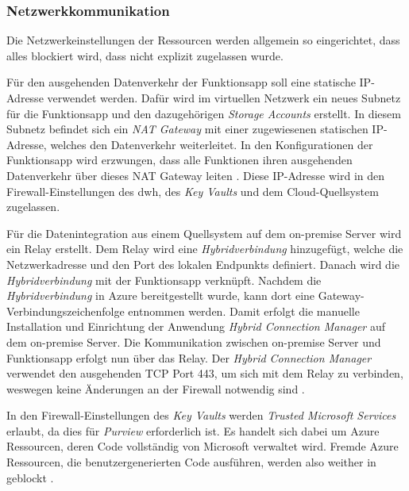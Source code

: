 \subsubsection{Netzwerkkommunikation} \label{subsec:infra:konfig:netzwerk}
Die Netzwerkeinstellungen der Ressourcen werden allgemein so eingerichtet, dass alles blockiert wird, dass nicht explizit zugelassen wurde. 

Für den ausgehenden Datenverkehr der Funktionsapp soll eine statische IP-Adresse verwendet werden. Dafür wird im virtuellen Netzwerk ein neues Subnetz für die Funktionsapp und den dazugehörigen \textit{Storage Accounts} erstellt. In diesem Subnetz befindet sich ein \textit{NAT Gateway} mit einer zugewiesenen statischen IP-Adresse, welches den Datenverkehr weiterleitet. In den Konfigurationen der Funktionsapp wird erzwungen, dass alle Funktionen ihren ausgehenden Datenverkehr über dieses NAT Gateway leiten \cite[vgl.][]{msdoc_22_func_ip}. Diese IP-Adresse wird in den Firewall-Einstellungen des \ac{dwh}, des \textit{Key Vaults} und dem Cloud-Quellsystem zugelassen.

Für die Datenintegration aus einem Quellsystem auf dem on-premise Server wird ein Relay erstellt. Dem Relay wird eine \textit{Hybridverbindung} hinzugefügt, welche die Netzwerkadresse und den Port des lokalen Endpunkts definiert. Danach wird die \textit{Hybridverbindung} mit der Funktionsapp verknüpft. Nachdem die \textit{Hybridverbindung} in Azure bereitgestellt wurde, kann dort eine Gateway-Verbindungszeichenfolge entnommen werden. Damit erfolgt die manuelle Installation und Einrichtung der Anwendung \textit{Hybrid Connection Manager} auf dem on-premise Server. Die Kommunikation zwischen on-premise Server und Funktionsapp erfolgt nun über das Relay. Der \textit{Hybrid Connection Manager} verwendet den ausgehenden TCP Port 443, um sich mit dem Relay zu verbinden, weswegen keine Änderungen an der Firewall notwendig sind \cite[vgl.][]{msdoc_22_func_hybridConn}.

In den Firewall-Einstellungen des \textit{Key Vaults} werden \textit{Trusted Microsoft Services} erlaubt, da dies für \textit{Purview} erforderlich ist. Es handelt sich dabei um Azure Ressourcen, deren Code vollständig von Microsoft verwaltet wird. Fremde Azure Ressourcen, die benutzergenerierten Code ausführen, werden also weither in geblockt \cite[vgl.][]{msdoc_21_keyVault_netSec}.

